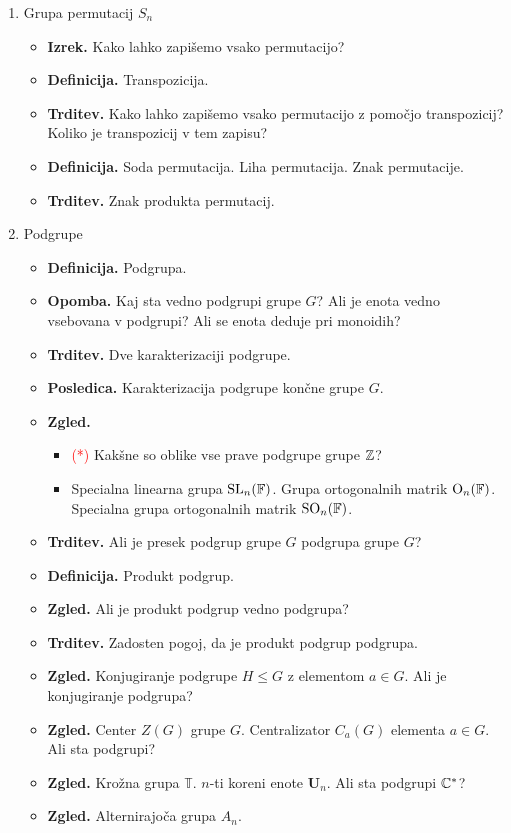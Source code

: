 \begin{enumerate}
    \item Grupa permutacij \(S_n\)
    \begin{itemize}
        \item \textbf{Izrek.} Kako lahko zapišemo vsako permutacijo?
        \item \textbf{Definicija.} Transpozicija.
        \item \textbf{Trditev.} Kako lahko zapišemo vsako permutacijo z pomočjo transpozicij? Koliko je transpozicij v tem zapisu?
        \item \textbf{Definicija.} Soda permutacija. Liha permutacija. Znak permutacije.
        \item \textbf{Trditev.} Znak produkta permutacij.
    \end{itemize}

    \item Podgrupe
    \begin{itemize}
        \item \textbf{Definicija.} Podgrupa.
        \item \textbf{Opomba.} Kaj sta vedno podgrupi grupe \(G\)? Ali je enota vedno vsebovana v podgrupi? Ali se enota deduje pri monoidih?
        \item \textbf{Trditev.} Dve karakterizaciji podgrupe.
        \item \textbf{Posledica.} Karakterizacija podgrupe končne grupe \(G\).
        \item \textbf{Zgled.} \ 
        \begin{itemize}
            \item \textcolor{red}{(*)}  Kakšne so oblike vse prave podgrupe grupe \(\mathbb{Z}\)?
            \item Specialna linearna grupa \(\operatorname{SL}_n(\mathbb{F})\). Grupa ortogonalnih matrik \(\text{O}_n(\mathbb{F})\). Specialna grupa ortogonalnih matrik \(\text{SO}_n(\mathbb{F})\).
        \end{itemize}
        \item \textbf{Trditev.} Ali je presek podgrup grupe \(G\) podgrupa grupe \(G\)?
        \item \textbf{Definicija.} Produkt podgrup.
        \item \textbf{Zgled.} Ali je produkt podgrup vedno podgrupa?
        \item \textbf{Trditev.} Zadosten pogoj, da je produkt podgrup podgrupa.
        \item \textbf{Zgled.} Konjugiranje podgrupe \(H \leq G\) z elementom \(a \in G\). Ali je konjugiranje podgrupa?
        \newpage
        \item \textbf{Zgled.} Center \(Z(G)\) grupe \(G\). Centralizator \(C_a(G)\) elementa \(a \in G\). Ali sta podgrupi?
        \item \textbf{Zgled.} Krožna grupa \(\mathbb{T}\). \(n\)-ti koreni enote \(\textbf{U}_n\). Ali sta podgrupi \(\mathbb{C}^*\)?
        \item \textbf{Zgled.} Alternirajoča grupa \(A_n\).
    \end{itemize}


\end{enumerate}
